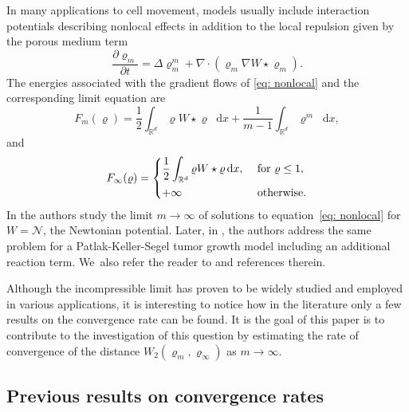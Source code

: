 \documentclass[JEP,XML,SOM,Unicode,published]{cedram}
\newcommand{\curlyN}{\mathcal{N}}
\newcommand{\partialt}[1]{\dfrac{\partial#1}{\partial t}}
\newcommand{\dx}[1]{\mathop{}\!\mathrm{d} #1}
\newcommand{\R}{\mathbb{R}}
\theoremstyle{plain}
\theoremstyle{remark}
\begin{document}
In many applications to cell movement, models usually include interaction potentials describing nonlocal effects in addition to the local repulsion given by the porous medium term
\begin{equation}\label{eq: nonlocal}
\partialt{\varrho_m} = \Delta \varrho_m^m +\nabla\cdot(\varrho_m \nabla W\star \varrho_m).
\end{equation}
The energies associated with the gradient flows of \eqref{eq: nonlocal} and the corresponding limit equation are
\begin{equation*}
F_m(\varrho) = \frac 12 \int_{\R^d} \varrho W\star \varrho \dx x + \frac{1}{m-1}\int_{\R^d} \varrho^m \dx x,
\end{equation*}
and
\begin{equation*}
F_\infty(\varrho) =
\begin{dcases}
\frac 12 \int_{\R^d} \varrho W\star \varrho \dx x, &\text{ for } \varrho\leq 1,\\
+\infty &\text{ otherwise}.
\end{dcases}
\end{equation*}
In \cite{CKY18} the authors study the limit $m\to\infty$ of solutions to equation~\eqref{eq: nonlocal} for \hbox{$W=\curlyN$}, the Newtonian potential. Later, in \cite{perthamePKS}, the authors address the same problem for a Patlak-Keller-Segel tumor growth model including an additional reaction term. We~also refer the reader to \cite{CT2020, CG2021, CCY2019} and references therein.

Although the incompressible limit has proven to be widely studied and employed in various applications, it is interesting to notice how in the literature only a few results on the convergence rate can be found.
It is the goal of this paper is to contribute to the investigation of this question by estimating the rate of convergence of the distance $W_2(\varrho_m, \varrho_\infty)$ as $m \to \infty$.

\subsection{Previous results on convergence rates}
\end{document}
